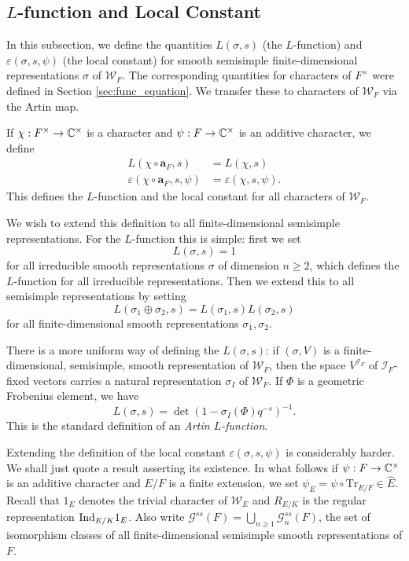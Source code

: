 \subsection{\texorpdfstring{$L$}{TEXT}-function and Local Constant}
In this subsection, we define the quantities $L(\sigma, s)$ (the $L$-function) and $\varepsilon(\sigma, s, \psi)$ (the local constant) for smooth semisimple finite-dimensional representations $\sigma$ of $\mathcal{W}_F$. The corresponding quantities for characters of $F^\times$ were defined in Section \ref{sec:func_equation}. We transfer these to characters of $\mathcal{W}_F$ via the Artin map.
\begin{defn}\label{defn:LfuncWeil}
	If $\chi: F^\times \to \mathbb{C}^\times$ is a character and $\psi: F\to \mathbb{C}^\times$ is an additive character, we define
	\begin{align*}
		L(\chi\circ\mathbf{a}_F, s) &= L(\chi, s)\\
		\varepsilon(\chi\circ\mathbf{a}_F, s, \psi) &= \varepsilon(\chi, s, \psi).
	\end{align*}
	This defines the $L$-function and the local constant for all characters of $\mathcal{W}_F$.
\end{defn}
We wish to extend this definition to all finite-dimensional semisimple representations. For the $L$-function this is simple: first we set
\[L(\sigma, s) = 1\]
for all irreducible smooth representations $\sigma$ of dimension $n\ge 2$, which defines the $L$-function for all irreducible representations. Then we extend this to all semisimple representations by setting
\[L(\sigma_1\oplus \sigma_2, s) = L(\sigma_1, s)L(\sigma_2, s)\]
for all finite-dimensional smooth representations $\sigma_1, \sigma_2$.
\begin{rem}
	There is a more uniform way of defining the $L(\sigma, s)$: if $(\sigma, V)$ is a finite-dimensional, semisimple, smooth representation of $\mathcal{W}_F$, then the space $V^{\mathcal{I}_F}$ of $\mathcal{I}_F$-fixed vectors carries a natural representation $\sigma_{I}$ of $\mathcal{W}_F$. If $\Phi$ is a geometric Frobenius element, we have
	\[L(\sigma, s) = \det(1 - \sigma_I(\Phi)q^{-s})^{-1}.\]
	This is the standard definition of an \emph{Artin $L$-function}. 
\end{rem}
Extending the definition of the local constant $\varepsilon(\sigma, s, \psi)$ is considerably harder. We shall just quote a result asserting its existence. In what follows if $\psi: F\to \mathbb{C}^\times$ is an additive character and $E/F$ is a finite extension, we set $\psi_E = \psi \circ \mathrm{Tr}_{E/F}\in \widehat{E}$. Recall that $1_E$ denotes the trivial character of $\mathcal{W}_E$ and $R_{E/K}$ is the regular representation $\mathrm{Ind}_{E/K} 1_E$. Also write $\mathcal{G}^{ss}(F) = \bigcup_{n\ge 1} \mathcal{G}^{ss}_n(F)$, the set of isomorphism classes of all finite-dimensional semisimple smooth representations of $F$.
